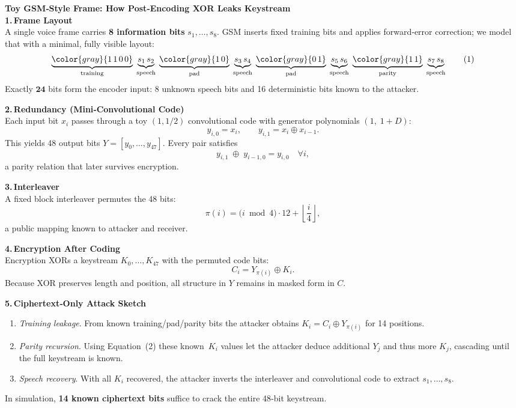 \begin{technical}
{\Large\textbf{Toy GSM‑Style Frame: How Post‑Encoding XOR Leaks Keystream}}\\[0.7em]

\noindent\textbf{1.\,Frame Layout}\\[0.5em]
A single voice frame carries \textbf{8 information bits} $s_1,\dots,s_8$.  
GSM inserts fixed training bits and applies forward‑error correction; we model that with a minimal, fully visible layout:
\[
\underbrace{\color{gray}{1\,1\,0\,0}}_{\text{training}}\;
\underbrace{s_1\,s_2}_{\text{speech}}\;
\underbrace{\color{gray}{1\,0}}_{\text{pad}}\;
\underbrace{s_3\,s_4}_{\text{speech}}\;
\underbrace{\color{gray}{0\,1}}_{\text{pad}}\;
\underbrace{s_5\,s_6}_{\text{speech}}\;
\underbrace{\color{gray}{1\,1}}_{\text{parity}}\;
\underbrace{s_7\,s_8}_{\text{speech}}
\tag{1}
\]
Exactly \(\mathbf{24}\) bits form the encoder input: 8 unknown speech bits and 16 deterministic bits known to the attacker.

\medskip
\noindent\textbf{2.\,Redundancy (Mini‑Convolutional Code)}\\[0.5em]
Each input bit \(x_i\) passes through a toy \((1,1/2)\) convolutional code with generator polynomials \((1,\;1+D)\):
\[
y_{i,0}=x_i,
\qquad
y_{i,1}=x_i \oplus x_{i-1}.
\]
This yields 48 output bits \(Y=[y_0,\dots,y_{47}]\).  Every pair satisfies
\[
y_{i,1}\;\oplus\;y_{i-1,0}=y_{i,0}
\quad\forall i,
\tag{2}
\]
a parity relation that later survives encryption.

\medskip
\noindent\textbf{3.\,Interleaver}\\[0.5em]
A fixed block interleaver permutes the 48 bits:
\[
\pi(i)=\bigl(i\bmod4\bigr)\cdot12+\left\lfloor\frac{i}{4}\right\rfloor,
\tag{3}
\]
a public mapping known to attacker and receiver.

\medskip
\noindent\textbf{4.\,Encryption After Coding}\\[0.5em]
Encryption XORs a keystream \(K_0,\dots,K_{47}\) with the permuted code bits:
\[
C_i = Y_{\pi(i)} \oplus K_i.
\tag{4}
\]
Because XOR preserves length and position, all structure in \(Y\) remains in masked form in \(C\).

\bigskip
\noindent\textbf{5.\,Ciphertext‑Only Attack Sketch}\\[-0.1em]
\begin{enumerate}[label=\arabic*., leftmargin=1.6em]
  \item \textit{Training leakage}. From known training/pad/parity bits the attacker obtains
        \(K_i = C_i \oplus Y_{\pi(i)}\) for 14 positions.
  \item \textit{Parity recursion}.  Using Equation (2) these known~\(K_i\) values let the
        attacker deduce additional \(Y_j\) and thus more \(K_j\), cascading until
        the full keystream is known.
  \item \textit{Speech recovery}.  With all \(K_i\) recovered, the attacker inverts
        the interleaver and convolutional code to extract \(s_1,\dots,s_8\).
\end{enumerate}
In simulation, \textbf{14 known ciphertext bits} suffice to crack the entire 48‑bit keystream.


\end{technical}
